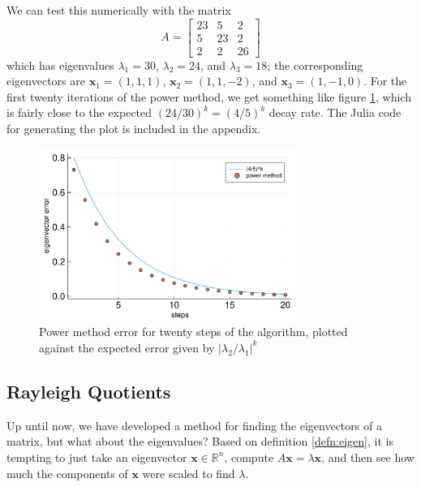 \documentclass{article}
\let\vec\mathbf
\begin{document}
We can test this numerically with the matrix
\begin{equation*}
  A = \begin{bmatrix}23 & 5 & 2 \\ 5 & 23 & 2 \\ 2 & 2 & 26\end{bmatrix}
\end{equation*}
which has eigenvalues $\lambda_1 = 30$, $\lambda_2 = 24$, and $\lambda_3 = 18$; the corresponding eigenvectors are $\vec{x}_1 = (1,1,1)$, $\vec{x}_2 = (1,1,-2)$, and $\vec{x}_3 = (1,-1,0)$. For the first twenty iterations of the power method, we get something like figure \ref{powermethod-plot}, which is fairly close to the expected $(24/30)^k = (4/5)^k$ decay rate. The Julia code for generating the plot is included in the appendix.

\begin{figure}[H]
  \begin{center}
    \includegraphics[width=0.75\textwidth]{power-method.pdf}
    \caption{Power method error for twenty steps of the algorithm, plotted against the expected error given by $|\lambda_2 / \lambda_1|^k$}
    \label{powermethod-plot}
  \end{center}
\end{figure}

\subsection{Rayleigh Quotients}
Up until now, we have developed a method for finding the eigenvectors of a matrix, but what about the eigenvalues? Based on definition \ref{defn:eigen}, it is tempting to just take an eigenvector $\vec{x} \in \mathbb{R}^n$, compute $A\vec{x} = \lambda\vec{x}$, and then see how much the components of $\vec{x}$ were scaled to find $\lambda$.
\end{document}
